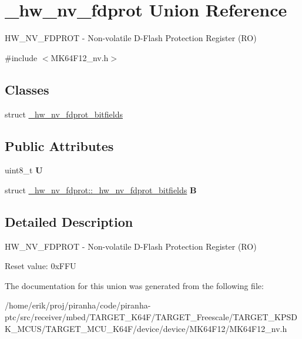 \hypertarget{union__hw__nv__fdprot}{}\section{\+\_\+hw\+\_\+nv\+\_\+fdprot Union Reference}
\label{union__hw__nv__fdprot}


H\+W\+\_\+\+N\+V\+\_\+\+F\+D\+P\+R\+OT -\/ Non-\/volatile D-\/\+Flash Protection Register (RO)  




{\ttfamily \#include $<$M\+K64\+F12\+\_\+nv.\+h$>$}

\subsection*{Classes}
\begin{DoxyCompactItemize}
\item 
struct \hyperlink{struct__hw__nv__fdprot_1_1__hw__nv__fdprot__bitfields}{\+\_\+hw\+\_\+nv\+\_\+fdprot\+\_\+bitfields}
\end{DoxyCompactItemize}
\subsection*{Public Attributes}
\begin{DoxyCompactItemize}
\item 
uint8\+\_\+t {\bfseries U}\hypertarget{union__hw__nv__fdprot_a9fc2a69e5132721f2a649d67d2c0b931}{}\label{union__hw__nv__fdprot_a9fc2a69e5132721f2a649d67d2c0b931}

\item 
struct \hyperlink{struct__hw__nv__fdprot_1_1__hw__nv__fdprot__bitfields}{\+\_\+hw\+\_\+nv\+\_\+fdprot\+::\+\_\+hw\+\_\+nv\+\_\+fdprot\+\_\+bitfields} {\bfseries B}\hypertarget{union__hw__nv__fdprot_aa398272c4c79ce398c9441b1abad14aa}{}\label{union__hw__nv__fdprot_aa398272c4c79ce398c9441b1abad14aa}

\end{DoxyCompactItemize}


\subsection{Detailed Description}
H\+W\+\_\+\+N\+V\+\_\+\+F\+D\+P\+R\+OT -\/ Non-\/volatile D-\/\+Flash Protection Register (RO) 

Reset value\+: 0x\+F\+FU 

The documentation for this union was generated from the following file\+:\begin{DoxyCompactItemize}
\item 
/home/erik/proj/piranha/code/piranha-\/ptc/src/receiver/mbed/\+T\+A\+R\+G\+E\+T\+\_\+\+K64\+F/\+T\+A\+R\+G\+E\+T\+\_\+\+Freescale/\+T\+A\+R\+G\+E\+T\+\_\+\+K\+P\+S\+D\+K\+\_\+\+M\+C\+U\+S/\+T\+A\+R\+G\+E\+T\+\_\+\+M\+C\+U\+\_\+\+K64\+F/device/device/\+M\+K64\+F12/M\+K64\+F12\+\_\+nv.\+h\end{DoxyCompactItemize}
